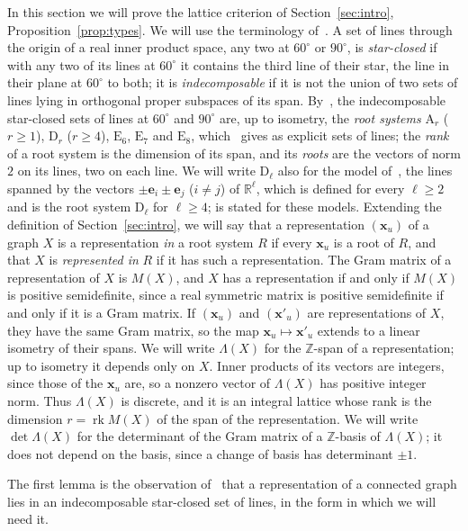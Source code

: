 \documentclass[11pt]{article}
\newcommand\ints{{\mathbb Z}}
\newcommand\re{{\mathbb R}}%
\newcommand\Zx{{\mathbf x}}
\newcommand\opk[1]{\mathop{\mathrm{#1}}\nolimits}
\newcommand\rk{\opk{rk}}
\theoremstyle{definition}
\newcommand{\typ}[1]{\mathrm{#1}}
\newcommand\Ze{{\mathbf e}}
\begin{document}
In this section we will prove the lattice criterion of Section~\ref{sec:intro},
Proposition~\ref{prop:types}. We will use the terminology of~\cite{CGSS}. A set of lines through
the origin of a real inner product space, any two at $60^\circ$ or $90^\circ$, is
\textsl{star-closed} if with any two of its lines at $60^\circ$ it contains the third line of
their star, the line in their plane at $60^\circ$ to both; it is \textsl{indecomposable} if it
is not the union of two sets of lines lying in orthogonal proper subspaces of its span.
By~\cite[Theorem~3.5]{CGSS}, the indecomposable star-closed sets of lines at $60^\circ$ and
$90^\circ$ are, up to isometry, the \textsl{root systems} $\typ A_r$ ($r\ge1$), $\typ D_r$
($r\ge4$), $\typ E_6$, $\typ E_7$ and $\typ E_8$, which~\cite[\S3]{CGSS} gives as explicit sets
of lines; the \textsl{rank} of a root system is the dimension of its span, and its
\textsl{roots} are the vectors of norm $2$ on its lines, two on each line. We will write
$\typ D_\ell$ also for the model of~\cite[\S3]{CGSS}, the lines spanned by the vectors
$\pm\Ze_i\pm\Ze_j$ ($i\ne j$) of $\re^\ell$, which is defined for every $\ell\ge2$ and is the
root system $\typ D_\ell$ for $\ell\ge4$; \cite[Theorem~4.2]{CGSS} is stated for these models.
Extending the definition of Section~\ref{sec:intro}, we will say that a representation $(\Zx_u)$
of a graph $X$ is a representation \textsl{in} a root system $R$ if every $\Zx_u$ is a root of
$R$, and that $X$ is \textsl{represented in} $R$ if it has such a representation. The Gram matrix
of a representation of $X$ is $M(X)$, and $X$ has a representation if and only if $M(X)$ is
positive semidefinite, since a real symmetric matrix is positive semidefinite if and only if it
is a Gram matrix. If $(\Zx_u)$ and $(\Zx'_u)$ are representations of $X$, they have the same Gram
matrix, so the map $\Zx_u\mapsto\Zx'_u$ extends to a linear isometry of their spans. We will write
$\Lambda(X)$ for the $\ints$-span of a representation; up to isometry it depends only on $X$.
Inner products of its vectors are integers, since those of the $\Zx_u$ are, so a nonzero vector
of $\Lambda(X)$ has positive integer norm. Thus $\Lambda(X)$ is discrete, and it is an integral
lattice whose rank is the dimension $r=\rk M(X)$ of the span of the representation. We will write
$\det\Lambda(X)$ for the determinant of the Gram matrix of a $\ints$-basis of $\Lambda(X)$; it does
not depend on the basis, since a change of basis has determinant $\pm1$.

The first lemma is the observation of~\cite[\S4]{CGSS} that a representation of a connected
graph lies in an indecomposable star-closed set of lines, in the form in which we will need it.
\end{document}
